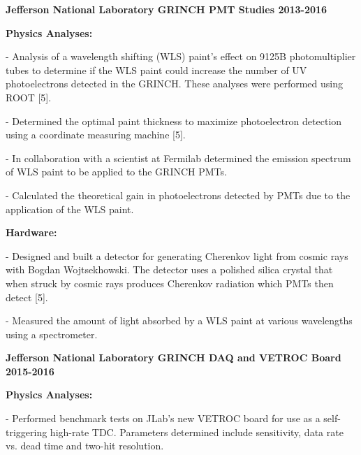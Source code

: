 \documentclass[letterpaper,10pt]{article}
\renewenvironment{itemize}{
  \begin{list}{}{
    \setlength{\leftmargin}{1.5em}
  }
}{
  \end{list}
}
\begin{document}
{\begin{itemize}
\begin{itemize}
\end{itemize}

\item {\large {\bf Jefferson National Laboratory GRINCH PMT Studies 2013-2016} }

 \begin{itemize}\itemsep1pt \parskip0pt 
  \item \textbf{Physics Analyses:}
   
    \begin{itemize}\itemsep1pt \parskip0pt 
     \item - Analysis of a wavelength shifting (WLS) paint's effect on 9125B photomultiplier tubes to determine if the WLS paint could increase the number of UV photoelectrons detected in the GRINCH. These analyses were performed using ROOT [5]. 
     \item - Determined the optimal paint thickness to maximize photoelectron detection using a coordinate measuring machine [5].
     \item - In collaboration with a scientist at Fermilab determined the emission spectrum of WLS paint to be applied to the GRINCH PMTs.
     \item - Calculated the theoretical gain in photoelectrons detected by PMTs due to the application of the WLS paint. 
     \end{itemize}

  \item \textbf{Hardware:}
    \begin{itemize}\itemsep1pt \parskip0pt 
     \item - Designed and built a detector for generating Cherenkov light from cosmic rays with Bogdan Wojtsekhowski. The detector uses a polished silica crystal that when struck by cosmic rays produces Cherenkov radiation which PMTs then detect [5]. 
     \item - Measured the amount of light absorbed by a WLS paint at various wavelengths using a spectrometer. 
    \end{itemize}
 \end{itemize}
 
\item {\large {\bf Jefferson National Laboratory GRINCH DAQ and VETROC Board 2015-2016} }

 \begin{itemize}\itemsep1pt \parskip0pt 
  \item \textbf{Physics Analyses:}
    \begin{itemize}\itemsep1pt \parskip0pt 
     \item - Performed benchmark tests on JLab's new VETROC board for use as a self-triggering high-rate TDC. Parameters determined include sensitivity, data rate vs. dead time and two-hit resolution.
     \end{itemize}


\end{itemize}
\end{itemize}}
\end{document}

